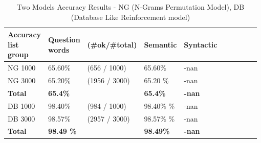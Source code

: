 \documentclass[letterpaper]{article}
\begin{document}
    
    
     
     
     
\begin{table}[ht]
\centering
\begin{tabular}{|p{0.14\linewidth}|p{0.14\linewidth}|p{0.14\linewidth}|p{0.14\linewidth}|p{0.14\linewidth}|p{0.14\linewidth}|p{0.14\linewidth}|}
\hline
\textbf{Accuracy list group}& \textbf{Question words}  & \textbf{(\#ok/\#total)}& \textbf{Semantic} & \textbf{Syntactic}\\
\hline
\hline
NG 1000 & 65.60\% & (656 / 1000) & 65.60\% & -nan\\
\hline
NG 3000 & 65.20\% & (1956 / 3000) & 65.20 \% & -nan\\
\hline
\textbf{Total}& \textbf{65.4\% }&  & \textbf{65.4\% }&  \textbf{-nan }\\
\hline
\hline
DB 1000 & 98.40\% & (984 / 1000) &98.40\% \% & -nan\\
\hline
DB 3000 & 98.57\% & (2957 / 3000) & 98.57\% \% & -nan\\
\hline
\textbf{Total}& \textbf{98.49 \% }&  & \textbf{98.49\% }&  \textbf{-nan}\\
\hline

\end{tabular}
\caption{Two Models Accuracy Results - NG (N-Grams Permutation Model), DB (Database Like Reinforcement model)}
\label{tab:two-models-accuracy-results}
\end{table}
\end{document}
